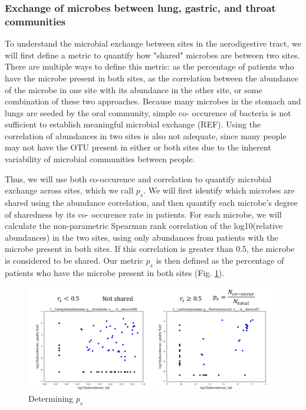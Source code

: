 \documentclass[12pt]{article}
\begin{document}
\subsubsection{Exchange of microbes between lung, gastric, and throat communities} \label{sec:exchange}
To understand the microbial exchange between sites in the 
aerodigestive tract, we will first define a metric to quantify how 
"shared" microbes are between two sites. There are multiple ways to 
define this metric: as the percentage of patients who have the microbe 
present in both sites, as the correlation between the abundance of the 
microbe in one site with its abundance in the other site, or some 
combination of these two approaches. Because many microbes in the 
stomach and lungs are seeded by the oral community, simple co-
occurence of bacteria is not sufficient to establish meaningful 
microbial exchange (REF). Using the correlation of abundances in two 
sites is also not adequate, since many people may not have the OTU 
present in either or both sites due to the inherent variability of 
microbial communities between people.

Thus, we will use both co-occurence and correlation to quantify 
microbial exchange across sites, which we call $p_s$. We will first 
identify which microbes are shared using the abundance correlation, 
and then quantify each microbe's degree of sharedness by its co-
occurence rate in patients. For each microbe, we will calculate the 
non-parametric Spearman rank correlation of the log10(relative 
abundances) in the two sites, using only abundances from patients with 
the microbe present in both sites. If this correlation is greater than 
0.5, the microbe is considered to be shared. Our metric $p_s$ is then 
defined as the percentage of patients who have the microbe present in 
both sites (Fig. \ref{fig:sharedness_defn}).


\begin{figure}
	\centering
    \includegraphics[scale=0.5]{sharedness_definition}
    \caption{Determining $p_s$}\label{fig:sharedness_defn}
\end{figure}
\end{document}
